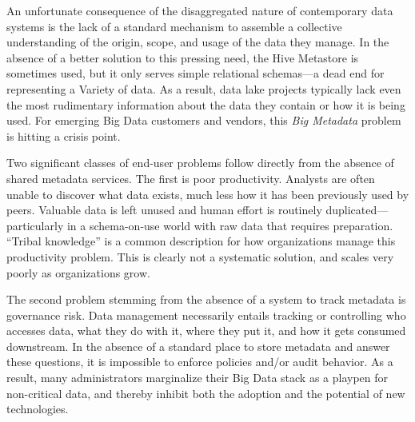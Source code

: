 \documentclass{sig-alternate}
\begin{document}
An unfortunate consequence of the disaggregated nature of contemporary data systems
is the lack of a standard mechanism
to assemble a collective understanding of the origin, scope, and usage of the data they manage.
In the absence of a better solution to this pressing need,
the 
Hive Metastore is sometimes used, but it only serves simple relational schemas---a dead end for representing a Variety of data. 
As a result, data lake projects typically lack 
even the most rudimentary information about the data they contain or how it is being used. 
For emerging Big Data customers and vendors, this \emph{Big Metadata} problem is hitting a crisis point.  

Two significant classes of end-user problems follow directly from the absence of shared metadata services.
The first is poor productivity.
Analysts are often unable to discover what data exists, much less how it has been previously used by peers. 
Valuable data is left unused
and human effort is routinely duplicated---particularly in a schema-on-use world with raw data that requires preparation.  
``Tribal knowledge'' is a common description for how organizations manage this productivity problem. 
This is clearly not a systematic solution, and scales very poorly as organizations grow.

The second problem 
stemming from the absence of a system to track metadata 
is governance risk. 
Data management necessarily entails tracking or controlling who accesses data, what they do with it, where they put it, and how it gets consumed downstream. 
In the absence of a standard place to store metadata and answer these questions, it is impossible to enforce policies and/or audit behavior. 
As a result, many administrators marginalize their Big Data stack as a playpen for non-critical data, and thereby inhibit both the adoption and the potential of new technologies.
\end{document}
